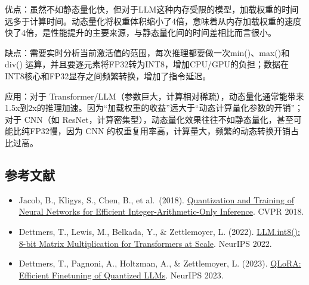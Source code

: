 优点：虽然不如静态量化快，但对于LLM这种内存受限的模型，加载权重的时间远多于计算时间。动态量化将权重体积缩小了4倍，意味着从内存加载权重的速度快了4倍，是性能提升的主要来源，与静态量化间的时间差相比而言很小。

缺点：需要实时分析当前激活值的范围，每次推理都要做一次min()、max()和div() 运算，并且要逐元素将FP32转为INT8，增加CPU/GPU的负担；数据在INT8核心和FP32显存之间频繁转换，增加了指令延迟。

应用：对于 Transformer/LLM（参数巨大，计算相对稀疏），动态量化通常能带来1.5x到2x的推理加速。因为``加载权重的收益''远大于``动态计算量化参数的开销''；对于 CNN（如 ResNet，计算密集型），动态量化效果往往不如静态量化，甚至可能比纯FP32慢，因为 CNN 的权重复用率高，计算量大，频繁的动态转换开销占比过高。

\FloatBarrier
{}
\hypertarget{ux53c2ux8003ux6587ux732e-88}{%
\subsection{参考文献}\label{ux53c2ux8003ux6587ux732e-88}}

\vspace{0.25em}
\begin{itemize}
\tightlist
\item
  Jacob, B., Kligys, S., Chen, B., et al.~(2018). \href{https://arxiv.org/abs/1712.05877}{Quantization and Training of Neural Networks for Efficient Integer-Arithmetic-Only Inference}. CVPR 2018.
\item
  Dettmers, T., Lewis, M., Belkada, Y., \& Zettlemoyer, L. (2022). \href{https://arxiv.org/abs/2208.07339}{LLM.int8(): 8-bit Matrix Multiplication for Transformers at Scale}. NeurIPS 2022.
\item
  Dettmers, T., Pagnoni, A., Holtzman, A., \& Zettlemoyer, L. (2023). \href{https://arxiv.org/abs/2305.14314}{QLoRA: Efficient Finetuning of Quantized LLMs}. NeurIPS 2023.
\end{itemize}

\clearpage
